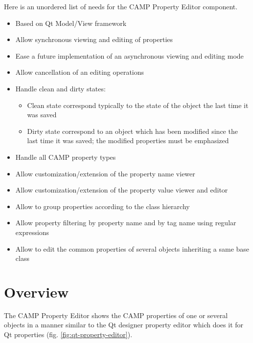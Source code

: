 \documentclass[a4paper, twoside]{report}
\begin{document}
Here is an unordered list of needs for the CAMP Property Editor component.

\begin{itemize}
    \item Based on Qt Model/View framework
    \item Allow synchronous viewing and editing of properties
    \item Ease a future implementation of an asynchronous viewing and editing mode
    \item Allow cancellation of an editing operations
    \item Handle clean and dirty states:
    \begin{itemize}
        \item Clean state correspond typically to the state of the object the last time it was saved
        \item Dirty state correspond to an object which has been modified since the last time it was
saved; the modified properties must be emphasized
    \end{itemize}
    \item Handle all CAMP property types
    \item Allow customization/extension of the property name viewer
    \item Allow customization/extension of the property value viewer and editor
    \item Allow to group properties according to the class hierarchy
    \item Allow property filtering by property name and by tag name using regular expressions
    \item Allow to edit the common properties of several objects inheriting a same base class
\end{itemize}

\chapter{Overview\label{sec:overview}}

The CAMP Property Editor shows the CAMP properties of one or several objects in a manner similar to the Qt
designer property editor which does it for Qt properties (fig. \ref{fig:qt-property-editor}).

\end{document}
